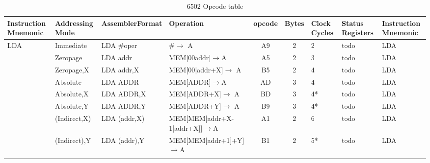 \documentclass[a4paper]{article}
\begin{document}
\begin{table}[h]
  \centering
  \begin{tabular}{m{2cm}m{2cm}m{2.5cm}lccm{1cm}m{2cm}m{2cm}}
\vbox{Instruction Mnemonic}& Addressing Mode& Assembler\qquad Format & Operation & opcode& Bytes & Clock Cycles & Status Registers & Instruction Mnemonic \\
 \hline \hline
LDA & Immediate & LDA \#oper & \#$\rightarrow$ A & A9 & 2 & 2 & todo & LDA \\
 & Zeropage & LDA addr & MEM[00addr]$\rightarrow$A & A5 & 2 & 3 & todo & LDA \\
 & Zeropage,X & LDA addr,X & MEM[00|addr+X]$\rightarrow$ A & B5 & 2 & 4 & todo & LDA \\
 & Absolute & LDA ADDR & MEM[ADDR]$\rightarrow$A & AD & 3 & 4 & todo & LDA \\
 & Absolute,X & LDA ADDR,X & MEM[ADDR+X]$\rightarrow$ A & BD & 3 & 4* & todo & LDA \\
 & Absolute,Y & LDA ADDR,Y & MEM[ADDR+Y]$\rightarrow$ A & B9 & 3 & 4* & todo & LDA \\
 & (Indirect,X) & LDA (addr,X) & MEM[MEM[addr+X-1|addr+X]]$\rightarrow $A & A1 & 2 & 6 & todo & LDA \\
 & (Indirect),Y & LDA (addr),Y & MEM[MEM[addr+1]+Y]$\rightarrow $A & B1 & 2 & 5* & todo & LDA \\
& &%
& & & & & & \\
 \hline

  \end{tabular}
  \caption{6502 Opcode table}
  \label{tab:6502opcodes}
\end{table}
\end{document}
